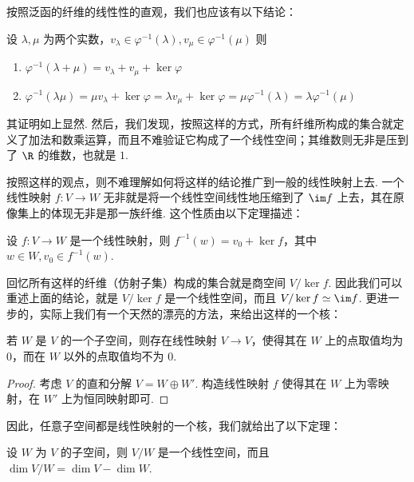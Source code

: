 按照泛函的纤维的线性性的直观，我们也应该有以下结论：

\begin{lemma}{}{}
    设 $\lambda, \mu$ 为两个实数，$v_\lambda \in \varphi^{-1}(\lambda), v_\mu \in \varphi^{-1} (\mu)$ 则

    \begin{enumerate}
        \item $\varphi^{-1} (\lambda + \mu) = v_\lambda + v_\mu + \ker \varphi$
        \item $\varphi^{-1} (\lambda \mu) = \mu v_\lambda + \ker \varphi = \lambda v_\mu + \ker \varphi = \mu \varphi^{-1} (\lambda) = \lambda \varphi^{-1} (\mu)$
    \end{enumerate}
\end{lemma}

其证明如上显然. 然后，我们发现，按照这样的方式，所有纤维所构成的集合就定义了加法和数乘运算，而且不难验证它构成了一个线性空间；其维数则无非是压到了 $\R$ 的维数，也就是 $1$.

按照这样的观点，则不难理解如何将这样的结论推广到一般的线性映射上去. 一个线性映射 $f\colon V \to W$ 无非就是将一个线性空间线性地压缩到了 $\im f$ 上去，其在原像集上的体现无非是那一族纤维. 这个性质由以下定理描述：

\begin{theorem}{}{}
    设 $f\colon V \to W$ 是一个线性映射，则 $f^{-1} (w) = v_0 + \ker f$，其中 $w \in W, v_0 \in f^{-1} (w)$.
\end{theorem}

回忆所有这样的纤维（仿射子集）构成的集合就是商空间 $V/\ker f$. 因此我们可以重述上面的结论，就是 $V/\ker f$ 是一个线性空间，而且 $V/\ker f \simeq \im f$. 更进一步的，实际上我们有一个天然的漂亮的方法，来给出这样的一个核：

\begin{lemma}{}{}
    若 $W$ 是 $V$ 的一个子空间，则存在线性映射 $V \to V$，使得其在 $W$ 上的点取值均为 $0$，而在 $W$ 以外的点取值均不为 $0$.
\end{lemma}

\begin{proof}
    考虑 $V$ 的直和分解 $V = W \oplus W'$. 构造线性映射 $f$ 使得其在 $W$ 上为零映射，在 $W'$ 上为恒同映射即可.
\end{proof}

因此，任意子空间都是线性映射的一个核，我们就给出了以下定理：

\begin{theorem}{}{}
    设 $W$ 为 $V$ 的子空间，则 $V/W$ 是一个线性空间，而且 $\dim V/W = \dim V - \dim W$.
\end{theorem}

